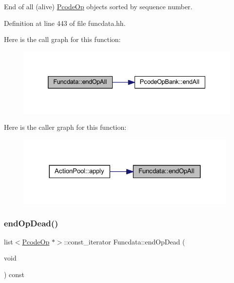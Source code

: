 End of all (alive) \mbox{\hyperlink{class_pcode_op}{Pcode\+Op}} objects sorted by sequence number. 



Definition at line 443 of file funcdata.\+hh.

Here is the call graph for this function\+:
\nopagebreak
\begin{figure}[H]
\begin{center}
\leavevmode
\includegraphics[width=332pt]{class_funcdata_a7e51e10ff92ea150cb4fe73d4fdd64dd_cgraph}
\end{center}
\end{figure}
Here is the caller graph for this function\+:
\nopagebreak
\begin{figure}[H]
\begin{center}
\leavevmode
\includegraphics[width=312pt]{class_funcdata_a7e51e10ff92ea150cb4fe73d4fdd64dd_icgraph}
\end{center}
\end{figure}
\mbox{\label{class_funcdata_a5974d38341f528cce4878658d11b4d0f}} 
\subsubsection{\texorpdfstring{endOpDead()}{endOpDead()}}
{\footnotesize\ttfamily list$<$\mbox{\hyperlink{class_pcode_op}{Pcode\+Op}} $\ast$$>$\+::const\+\_\+iterator Funcdata\+::end\+Op\+Dead (\begin{DoxyParamCaption}\item[{void}]{ }\end{DoxyParamCaption}) const\hspace{0.3cm}{\ttfamily [inline]}}



